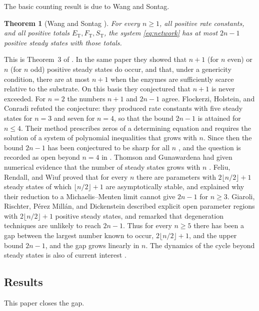 \documentclass[11pt]{article}
\theoremstyle{plain}
\newtheorem{theorem}{Theorem}[section]
\theoremstyle{definition}
\theoremstyle{remark}
\numberwithin{equation}{section}
\newcommand{\ET}{E_{\mathrm T}}
\newcommand{\FT}{F_{\mathrm T}}
\newcommand{\ST}{S_{\mathrm T}}
\begin{document}
The basic counting result is due to Wang and Sontag.

\begin{theorem}[Wang and Sontag {\cite{WangSontag2008}}]\label{thm:WS}
For every \(n\ge1\), all positive rate constants, and all positive totals \(\ET,\FT,\ST\), the
system \eqref{eq:network} has at most \(2n-1\) positive steady states with those totals.
\end{theorem}

This is Theorem~3 of \cite{WangSontag2008}. In the same paper they showed that \(n+1\) (for
\(n\) even) or \(n\) (for \(n\) odd) positive steady states do occur, and that, under a
genericity condition, there are at most \(n+1\) when the enzymes are sufficiently scarce
relative to the substrate. On this basis they conjectured that \(n+1\) is never exceeded. For
\(n=2\) the numbers \(n+1\) and \(2n-1\) agree. Flockerzi, Holstein, and Conradi
\cite{FHC2014} refuted the conjecture: they produced rate constants with five steady states
for \(n=3\) and seven for \(n=4\), so that the bound \(2n-1\) is attained for \(n\le4\). Their
method prescribes zeros of a determining equation and requires the solution of a system of
polynomial inequalities that grows with \(n\). Since then the bound \(2n-1\) has been
conjectured to be sharp for all \(n\) \cite{FRW2020,FKdWY2023}, and the question is recorded
as open beyond \(n=4\) in \cite{FKdWY2023}. Thomson and Gunawardena had given numerical
evidence that the number of steady states grows with \(n\) \cite{ThomsonGunawardena2009}.
Feliu, Rendall, and Wiuf \cite{FRW2020} proved that for every \(n\) there are parameters with
\(2\lfloor n/2\rfloor+1\) steady states of which \(\lfloor n/2\rfloor+1\) are asymptotically
stable, and explained why their reduction to a Michaelis--Menten limit cannot give \(2n-1\)
for \(n\ge3\). Giaroli, Rischter, P\'erez Mill\'an, and Dickenstein \cite{GRPD2019} described
explicit open parameter regions with \(2\lfloor n/2\rfloor+1\) positive steady states, and
remarked that degeneration techniques are unlikely to reach \(2n-1\). Thus for every \(n\ge5\)
there has been a gap between the largest number known to occur, \(2\lfloor n/2\rfloor+1\), and
the upper bound \(2n-1\), and the gap grows linearly in \(n\). The dynamics of the cycle
beyond steady states is also of current interest \cite{CMS2019,CFM2020,ConradiMincheva2024}.

\subsection{Results}
This paper closes the gap.
\end{document}
